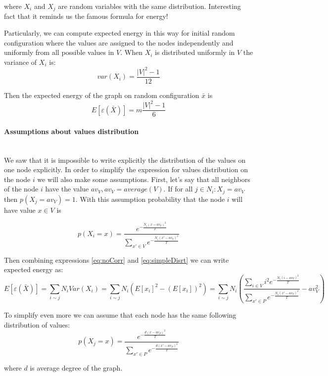 \documentclass[12pt]{report}
\begin{document}
where $X_i$ and $X_j$ are random variables with the same distribution.
Interesting fact that it reminds us the famous formula for energy!

Particularly, we can compute expected energy in this way for initial random configuration where the values are assigned to the nodes independently and uniformly from all possible values in $V$. 
When $X_i$ is distributed uniformly in $V$ the variance of $X_i$ is:
$$var(X_i) = \frac{|V|^2-1}{12}$$

Then the expected energy of the graph on random configuration $\bar{x}$ is
$$E[\varepsilon (\bar{X})] =  m\frac{|V|^2-1}{6}$$


\paragraph{Assumptions about values distribution}
\mbox{} \\

We saw that it is impossible to write explicitly the distribution of the values on one node explicitly. In order to simplify the expression for values distribution on the node $i$ we will also make some assumptions. First, let's say that all neighbors of the node $i$ have the value $av_V, av_V = average(V)$. If for all $j \in N_i : X_j = av_V$ then 
$p(X_j  = av_V) = 1$. With this assumption probability that the node $i$ will have value $x \in V$ is

\begin{equation}
\label{eq:simpleDisrt}
 p(X_i = x) = 
\frac{ e^{-\frac{N_i(x - av_V)^2}{T}} }{ \sum\limits_{x'\in V} e^{-\frac{N_i(x' - av_V)^2}{T}}}
\end{equation}

Then combining expressions \ref{eq:noCorr} and \ref{eq:simpleDisrt} we can write expected energy as:
$$ E[\varepsilon (\bar{X})] =  \sum_{i \sim j} N_iVar(X_i) =
\sum_{i \sim j} N_i  \left(E[x_i]^2 - (E[x_i])^2\right) =
\sum_{i \sim j} N_i \left(\frac{ \sum\limits_{i\in V} i^2 e^{- \frac{N_i(i - av_V)^2}{T}} }{ \sum\limits_{x'\in P} e^{-\frac{N_i(x' - av_V)^2}{T}}} - av_V^2\right)
$$

To simplify even more we can assume that each node has the same following distribution of values:
\begin{equation}
\label{eq:simpleDisrt2}
p(X_j = x) = 
\frac{ e^{-\frac{d(x - av_P)^2}{T}} }{ \sum\limits_{x'\in P} e^{-\frac{d(x' - av_P)^2}{T}}}
\end{equation}

where $d$ is average degree of the graph. 
\end{document}
